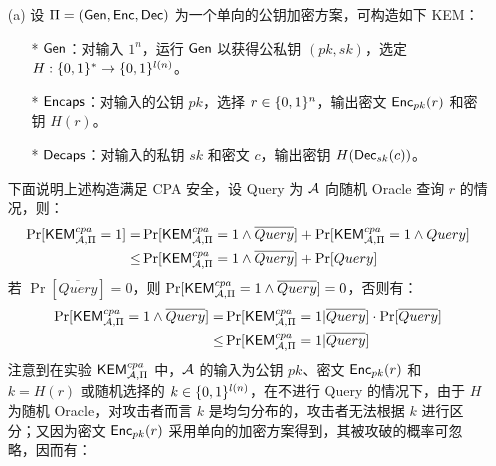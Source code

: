 \begin{questions}
        \begin{solution}
            \begin{enumerate}
                \item[(a)] 设 $\Pi=(\mathsf{Gen},\mathsf{Enc},\mathsf{Dec})$ 为一个单向的公钥加密方案，可构造如下 KEM：
                    \begin{enumerate}
                        \item[*] $\mathsf{Gen}$：对输入 $1^n$，运行 $\mathsf{Gen}$ 以获得公私钥 $(pk,sk)$，选定 $H: \{{0,1}\}^*\rightarrow\{{0,1}\}^{l(n)}$。
                        \item[*] $\mathsf{Encaps}$：对输入的公钥 $pk$，选择 $r\in\{{0,1}\}^n$，输出密文 $\mathsf{Enc}_{pk}(r)$ 和密钥 $H(r)$。
                        \item[*] $\mathsf{Decaps}$：对输入的私钥 $sk$ 和密文 $c$，输出密钥 $H(\mathsf{Dec}_{sk}(c))$。
                    \end{enumerate}
                    下面说明上述构造满足 CPA 安全，设 Query 为 $\mathcal{A}$ 向随机 Oracle 查询 $r$ 的情况，则：
                    \begin{equation}
                        \begin{aligned}
                            \Pr[\mathsf{KEM}^{cpa}_{\mathcal{A},\Pi}=1]=&\Pr[\mathsf{KEM}^{cpa}_{\mathcal{A},\Pi}=1\wedge\overline{Query}]+\Pr[\mathsf{KEM}^{cpa}_{\mathcal{A},\Pi}=1\wedge{Query}]\\
                            \leq&\Pr[\mathsf{KEM}^{cpa}_{\mathcal{A},\Pi}=1\wedge\overline{Query}]+\Pr[Query]
                        \end{aligned}
                    \end{equation}
                    若 $\Pr[\overline{Query}]=0$，则 $\Pr[\mathsf{KEM}^{cpa}_{\mathcal{A},\Pi}=1\wedge\overline{Query}]=0$，否则有：
                    \begin{equation}
                        \begin{aligned}
                            \Pr[\mathsf{KEM}^{cpa}_{\mathcal{A},\Pi}=1\wedge\overline{Query}]=&\Pr[\mathsf{KEM}^{cpa}_{\mathcal{A},\Pi}=1|\overline{Query}]\cdot\Pr[\overline{Query}]\\
                            \leq&\Pr[\mathsf{KEM}^{cpa}_{\mathcal{A},\Pi}=1|\overline{Query}]
                        \end{aligned}
                    \end{equation}
                    注意到在实验 $\mathsf{KEM}^{cpa}_{\mathcal{A},\Pi}$ 中，$\mathcal{A}$ 的输入为公钥 $pk$、密文 $\mathsf{Enc}_{pk}(r)$ 和 $k=H(r)$ 或随机选择的 $k\in\{{0,1}\}^{l(n)}$，在不进行 Query 的情况下，由于 $H$ 为随机 Oracle，对攻击者而言 $k$ 是均匀分布的，攻击者无法根据 $k$ 进行区分；又因为密文 $\mathsf{Enc}_{pk}(r)$ 采用单向的加密方案得到，其被攻破的概率可忽略，因而有：

\end{enumerate}
\end{solution}
\end{questions}
